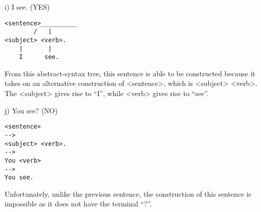\documentclass{article}
\begin{document}
\begin{alphabetize}
\item i) I see. (YES) 
\begin{lstlisting}
<sentence>__________
        /   |  
<subject> <verb>. 
    |       |         
    I      see.   
\end{lstlisting} \linebreak
From this abstract-syntax tree, this sentence is able to be constructed because it takes on an alternative construction of <sentence>, which is <subject> <verb>. The <subject> gives rise to “I”, while <verb> gives rise to “see”. \linebreak

\item j)	You see? (NO) 
\begin{lstlisting}
<sentence> 
-->  
<subject> <verb>.
--> 
You <verb>
--> 
You see.
\end{lstlisting} \linebreak
Unfortunately, unlike the previous sentence, the construction of this sentence is impossible as it does not have the terminal “?”. \linebreak \linebreak


\end{alphabetize}
\end{document}
